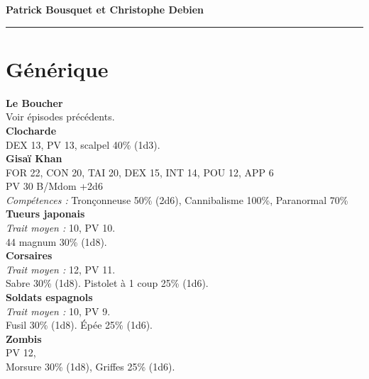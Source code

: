 \documentclass[11pt,twoside,a4paper]{book}
\begin{document}
\textbf{Patrick Bousquet et Christophe Debien}~\\

\begin{center} \rule{10cm}{0.1cm} \end{center}

\clearpage

\section*{G{\'e}n{\'e}rique}

\textbf{Le Boucher}~\\
Voir {\'e}pisodes pr{\'e}c{\'e}dents. ~\\

\textbf{Clocharde}~\\
DEX 13, PV 13, scalpel 40\% (1d3).~\\

\textbf{Gisa{\"i} Khan}~\\
FOR 22, CON 20, TAI 20, DEX 15, INT 14, POU 12, APP 6~\\
PV 30 B/Mdom +2d6~\\
\emph{Comp{\'e}tences : }Tron\c{c}onneuse 50\% (2d6), Cannibalisme 100\%, Paranormal 70\%~\\

\textbf{Tueurs japonais}~\\
\emph{Trait moyen : }10, PV 10.~\\
44 magnum 30\% (1d8).~\\

\textbf{Corsaires}~\\
\emph{Trait moyen : }12, PV 11.~\\
Sabre 30\% (1d8). Pistolet {\`a} 1 coup 25\% (1d6).~\\

\textbf{Soldats espagnols}~\\
\emph{Trait moyen : }10, PV 9.~\\
Fusil 30\% (1d8). {\'E}p{\'e}e 25\% (1d6).~\\

\textbf{Zombis}~\\
PV 12,~\\
Morsure 30\% (1d8), Griffes 25\% (1d6).~\\
\end{document}
